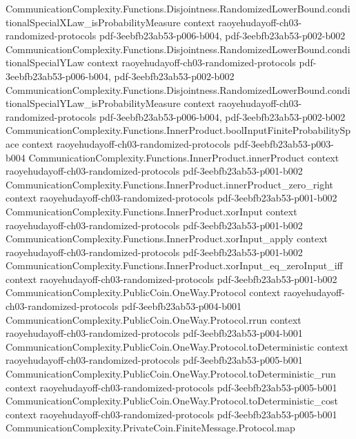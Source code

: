 \begin{theorem}
\proofstep
  {CommunicationComplexity.Functions.Disjointness.RandomizedLowerBound.conditionalSpecialXLaw_isProbabilityMeasure}
  {context}
  {raoyehudayoff-ch03-randomized-protocols}
  {pdf-3eebfb23ab53-p006-b004,
    pdf-3eebfb23ab53-p002-b002}
\proofstep
  {CommunicationComplexity.Functions.Disjointness.RandomizedLowerBound.conditionalSpecialYLaw}
  {context}
  {raoyehudayoff-ch03-randomized-protocols}
  {pdf-3eebfb23ab53-p006-b004,
    pdf-3eebfb23ab53-p002-b002}
\proofstep
  {CommunicationComplexity.Functions.Disjointness.RandomizedLowerBound.conditionalSpecialYLaw_isProbabilityMeasure}
  {context}
  {raoyehudayoff-ch03-randomized-protocols}
  {pdf-3eebfb23ab53-p006-b004,
    pdf-3eebfb23ab53-p002-b002}
\proofstep
  {CommunicationComplexity.Functions.InnerProduct.boolInputFiniteProbabilitySpace}
  {context}
  {raoyehudayoff-ch03-randomized-protocols}
  {pdf-3eebfb23ab53-p003-b004}
\proofstep
  {CommunicationComplexity.Functions.InnerProduct.innerProduct}
  {context}
  {raoyehudayoff-ch03-randomized-protocols}
  {pdf-3eebfb23ab53-p001-b002}
\proofstep
  {CommunicationComplexity.Functions.InnerProduct.innerProduct_zero_right}
  {context}
  {raoyehudayoff-ch03-randomized-protocols}
  {pdf-3eebfb23ab53-p001-b002}
\proofstep
  {CommunicationComplexity.Functions.InnerProduct.xorInput}
  {context}
  {raoyehudayoff-ch03-randomized-protocols}
  {pdf-3eebfb23ab53-p001-b002}
\proofstep
  {CommunicationComplexity.Functions.InnerProduct.xorInput_apply}
  {context}
  {raoyehudayoff-ch03-randomized-protocols}
  {pdf-3eebfb23ab53-p001-b002}
\proofstep
  {CommunicationComplexity.Functions.InnerProduct.xorInput_eq_zeroInput_iff}
  {context}
  {raoyehudayoff-ch03-randomized-protocols}
  {pdf-3eebfb23ab53-p001-b002}
\proofstep
  {CommunicationComplexity.PublicCoin.OneWay.Protocol}
  {context}
  {raoyehudayoff-ch03-randomized-protocols}
  {pdf-3eebfb23ab53-p004-b001}
\proofstep
  {CommunicationComplexity.PublicCoin.OneWay.Protocol.rrun}
  {context}
  {raoyehudayoff-ch03-randomized-protocols}
  {pdf-3eebfb23ab53-p004-b001}
\proofstep
  {CommunicationComplexity.PublicCoin.OneWay.Protocol.toDeterministic}
  {context}
  {raoyehudayoff-ch03-randomized-protocols}
  {pdf-3eebfb23ab53-p005-b001}
\proofstep
  {CommunicationComplexity.PublicCoin.OneWay.Protocol.toDeterministic_run}
  {context}
  {raoyehudayoff-ch03-randomized-protocols}
  {pdf-3eebfb23ab53-p005-b001}
\proofstep
  {CommunicationComplexity.PublicCoin.OneWay.Protocol.toDeterministic_cost}
  {context}
  {raoyehudayoff-ch03-randomized-protocols}
  {pdf-3eebfb23ab53-p005-b001}
\proofstep
  {CommunicationComplexity.PrivateCoin.FiniteMessage.Protocol.map}

\end{theorem}
